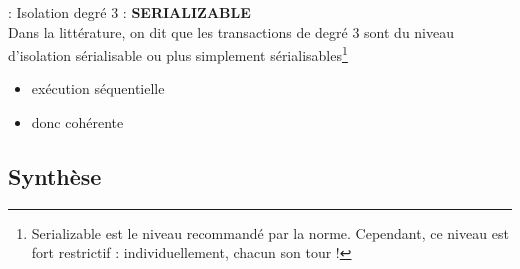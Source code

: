 \documentclass[10pt]{beamer}
\begin{document}
\begin{frame}{\secname : \subsecname}
    Isolation degré 3 : \textbf{SERIALIZABLE} \\
    Dans la littérature, on dit que les transactions de degré 3 sont du niveau d'isolation sérialisable ou plus simplement sérialisables\footnote{Serializable est le niveau recommandé par la norme. Cependant, ce niveau est fort restrictif : individuellement, chacun son tour !}
    \begin{itemize}
        \item exécution séquentielle
        \item donc cohérente
    \end{itemize}
\end{frame}
\subsection{Synthèse}
\end{document}
